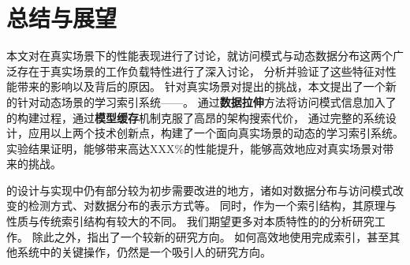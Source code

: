 \chapter{总结与展望}
\label{chap:concl}

本文对{\li}在真实场景下的性能表现进行了讨论，就访问模式与动态数据分布这两个广泛存在于真实场景的工作负载特性进行了深入讨论，
分析并验证了这些特征对{\li}性能带来的影响以及背后的原因。
针对真实场景对{\li}提出的挑战，本文提出了一个新的针对动态场景的学习索引系统{------}{\sys}。
通过\textbf{数据拉伸}方法{\sys}将访问模式信息加入了{\li}的构建过程，通过\textbf{模型缓存}机制{\sys}克服了高昂的{\li}架构搜索代价，
通过完整的系统设计，{\sys}应用以上两个技术创新点，构建了一个面向真实场景的动态的学习索引系统。
实验结果证明，{\sys}能够带来高达XXX\%的性能提升，能够高效地应对真实场景对{\li}带来的挑战。


{\sys}的设计与实现中仍有部分较为初步需要改进的地方，诸如对数据分布与访问模式改变的检测方式、对数据分布的表示方式等。
同时，{\li}作为一个索引结构，其原理与性质与传统索引结构有较大的不同。
我们期望更多对{\li}本质特性的的分析研究工作。
除此之外，{\li}指出了一个较新的研究方向。
如何高效地使用{\model}完成索引，甚至其他系统中的关键操作，仍然是一个吸引人的研究方向。
